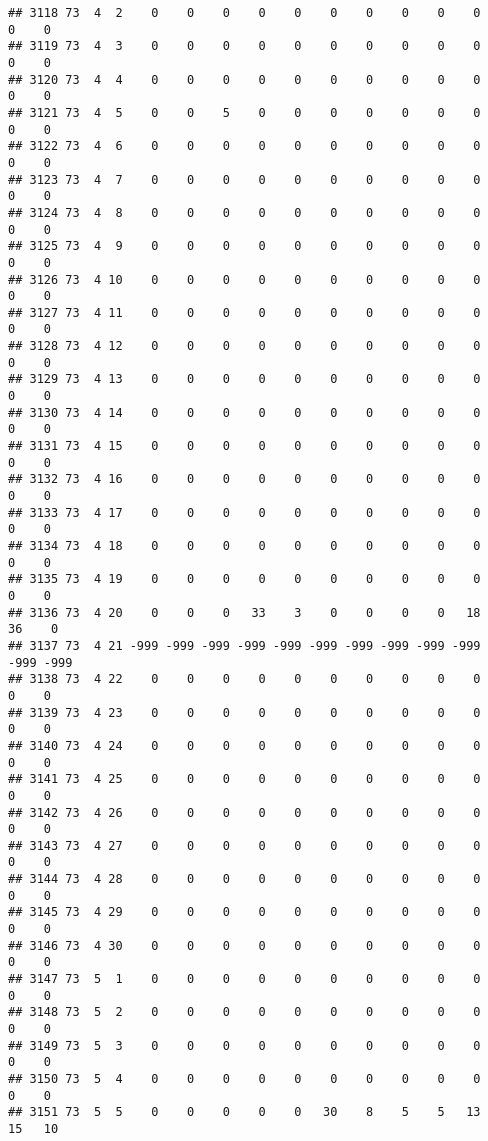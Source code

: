 \documentclass[]{article}
\begin{document}
\begin{verbatim}
## 3118 73  4  2    0    0    0    0    0    0    0    0    0    0    0    0
## 3119 73  4  3    0    0    0    0    0    0    0    0    0    0    0    0
## 3120 73  4  4    0    0    0    0    0    0    0    0    0    0    0    0
## 3121 73  4  5    0    0    5    0    0    0    0    0    0    0    0    0
## 3122 73  4  6    0    0    0    0    0    0    0    0    0    0    0    0
## 3123 73  4  7    0    0    0    0    0    0    0    0    0    0    0    0
## 3124 73  4  8    0    0    0    0    0    0    0    0    0    0    0    0
## 3125 73  4  9    0    0    0    0    0    0    0    0    0    0    0    0
## 3126 73  4 10    0    0    0    0    0    0    0    0    0    0    0    0
## 3127 73  4 11    0    0    0    0    0    0    0    0    0    0    0    0
## 3128 73  4 12    0    0    0    0    0    0    0    0    0    0    0    0
## 3129 73  4 13    0    0    0    0    0    0    0    0    0    0    0    0
## 3130 73  4 14    0    0    0    0    0    0    0    0    0    0    0    0
## 3131 73  4 15    0    0    0    0    0    0    0    0    0    0    0    0
## 3132 73  4 16    0    0    0    0    0    0    0    0    0    0    0    0
## 3133 73  4 17    0    0    0    0    0    0    0    0    0    0    0    0
## 3134 73  4 18    0    0    0    0    0    0    0    0    0    0    0    0
## 3135 73  4 19    0    0    0    0    0    0    0    0    0    0    0    0
## 3136 73  4 20    0    0    0   33    3    0    0    0    0   18   36    0
## 3137 73  4 21 -999 -999 -999 -999 -999 -999 -999 -999 -999 -999 -999 -999
## 3138 73  4 22    0    0    0    0    0    0    0    0    0    0    0    0
## 3139 73  4 23    0    0    0    0    0    0    0    0    0    0    0    0
## 3140 73  4 24    0    0    0    0    0    0    0    0    0    0    0    0
## 3141 73  4 25    0    0    0    0    0    0    0    0    0    0    0    0
## 3142 73  4 26    0    0    0    0    0    0    0    0    0    0    0    0
## 3143 73  4 27    0    0    0    0    0    0    0    0    0    0    0    0
## 3144 73  4 28    0    0    0    0    0    0    0    0    0    0    0    0
## 3145 73  4 29    0    0    0    0    0    0    0    0    0    0    0    0
## 3146 73  4 30    0    0    0    0    0    0    0    0    0    0    0    0
## 3147 73  5  1    0    0    0    0    0    0    0    0    0    0    0    0
## 3148 73  5  2    0    0    0    0    0    0    0    0    0    0    0    0
## 3149 73  5  3    0    0    0    0    0    0    0    0    0    0    0    0
## 3150 73  5  4    0    0    0    0    0    0    0    0    0    0    0    0
## 3151 73  5  5    0    0    0    0    0   30    8    5    5   13   15   10

\end{verbatim}
\end{document}
